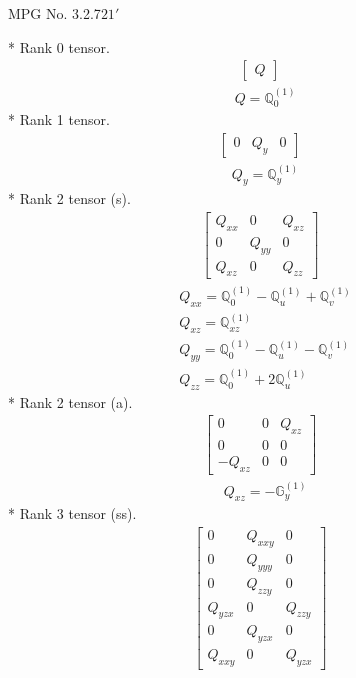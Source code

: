 \documentclass[fleqn,8pt,landscape]{jsarticle}
\begin{document}
\setcounter{MaxMatrixCols}{32}

\renewcommand{\tablename}{Table~}
\renewcommand{\figurename}{Figure~}
\begin{center}
\LARGE
MPG No. 3.2.7\quad$21'$
\end{center}
* Rank 0 tensor.
\begin{align*}
\begin{bmatrix} Q \end{bmatrix}
\end{align*}
\begin{align*}
& Q = \mathbb{Q}_{0}^{(1)}
\end{align*}
* Rank 1 tensor.
\begin{align*}
\begin{bmatrix} 0 & Q_{y} & 0 \end{bmatrix}
\end{align*}
\begin{align*}
& Q_{y} = \mathbb{Q}_{y}^{(1)}
\end{align*}
* Rank 2 tensor (s).
\begin{align*}
\begin{bmatrix} Q_{xx} & 0 & Q_{xz} \\ 0 & Q_{yy} & 0 \\ Q_{xz} & 0 & Q_{zz} \end{bmatrix}
\end{align*}
\begin{align*}
& Q_{xx} = \mathbb{Q}_{0}^{(1)} - \mathbb{Q}_{u}^{(1)} + \mathbb{Q}_{v}^{(1)} \\
& Q_{xz} = \mathbb{Q}_{xz}^{(1)} \\
& Q_{yy} = \mathbb{Q}_{0}^{(1)} - \mathbb{Q}_{u}^{(1)} - \mathbb{Q}_{v}^{(1)} \\
& Q_{zz} = \mathbb{Q}_{0}^{(1)} + 2 \mathbb{Q}_{u}^{(1)}
\end{align*}
* Rank 2 tensor (a).
\begin{align*}
\begin{bmatrix} 0 & 0 & Q_{xz} \\ 0 & 0 & 0 \\ - Q_{xz} & 0 & 0 \end{bmatrix}
\end{align*}
\begin{align*}
& Q_{xz} = - \mathbb{G}_{y}^{(1)}
\end{align*}
* Rank 3 tensor (ss).
\begin{align*}
\begin{bmatrix} 0 & Q_{xxy} & 0 \\ 0 & Q_{yyy} & 0 \\ 0 & Q_{zzy} & 0 \\ Q_{yzx} & 0 & Q_{zzy} \\ 0 & Q_{yzx} & 0 \\ Q_{xxy} & 0 & Q_{yzx} \end{bmatrix}
\end{align*}
\end{document}
